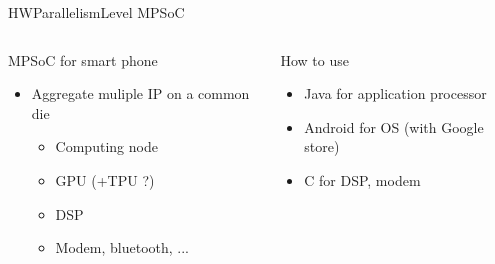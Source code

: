 %
\begin{Frame}{HWParallelismLevel MPSoC}
  \begin{columns}[t]
    \begin{column}{\HW} %
      \begin{block}{MPSoC for smart phone}
        \begin{itemize}
        \item Aggregate muliple IP on a common die
          \begin{itemize}
          \item Computing node
          \item GPU (+TPU ?)
          \item DSP
          \item Modem, bluetooth, ...
          \end{itemize}
        \end{itemize}
      \end{block} 
    \end{column}
    
    \begin{column}{\HW} %
      \begin{block}{How to use}
        \begin{itemize}
        \item Java for application processor
        \item Android for OS (with Google store)
        \item C for DSP, modem
        \end{itemize}
      \end{block}   
    \end{column}
  \end{columns}  
\end{Frame}


